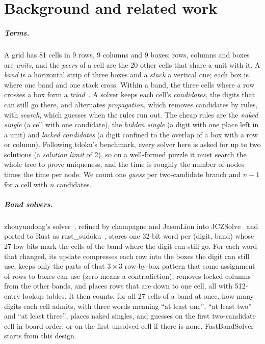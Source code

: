 \documentclass[a4paper,USenglish,cleveref,anonymous]{lipics-v2021}
\begin{document}
\section{Background and related work}
\label{sec:related}

\subparagraph{Terms.} A grid has 81 cells in 9 rows, 9 columns and 9 boxes; rows, columns and boxes are \emph{units},
and the \emph{peers} of a cell are the 20 other cells that share a unit with it. A \emph{band} is a horizontal strip of
three boxes and a \emph{stack} a vertical one; each box is where one band and one stack cross. Within a band, the three
cells where a row crosses a box form a \emph{triad}~\cite{dillon2019nerdsniped}. A solver keeps each cell's
\emph{candidates}, the digits that can still go there, and alternates \emph{propagation}, which removes candidates by
rules, with \emph{search}, which guesses when the rules run out. The cheap rules are the \emph{naked single} (a cell
with one candidate), the \emph{hidden single} (a digit with one place left in a unit) and \emph{locked candidates}
(a digit confined to the overlap of a box with a row or column). Following tdoku's benchmark, every solver here is
asked for up to two solutions (a \emph{solution limit} of 2), so on a well-formed puzzle it must search the whole tree
to prove uniqueness, and the time is roughly the number of nodes times the time per node. We count one \emph{guess}
per two-candidate branch and $n-1$ for a cell with $n$ candidates.

\subparagraph{Band solvers.} zhouyundong's solver~\cite{zhouyundong2012solver}, refined by champagne and JasonLion into
JCZSolve~\cite{jczsolve2016} and ported to Rust as rust\_sudoku~\cite{emerentius2018sudoku}, stores one 32-bit word per
(digit, band) whose 27 low bits mark the cells of the band where the digit can still go. For each word that changed,
its update compresses each row into the boxes the digit can still use, keeps only the parts of that $3\times 3$
row-by-box pattern that some assignment of rows to boxes can use (zero means a contradiction), removes locked columns
from the other bands, and places rows that are down to one cell, all with 512-entry lookup tables. It then counts, for
all 27 cells of a band at once, how many digits each cell admits, with three words meaning ``at least one'', ``at least
two'' and ``at least three'', places naked singles, and guesses on the first two-candidate cell in board order, or on
the first unsolved cell if there is none. FastBandSolver starts from this design.
\end{document}
